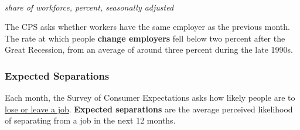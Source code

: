 \begin{minipage}{0.40\textwidth}
\\
\footnotesize{\textit{share of workforce, percent, seasonally adjusted}}
\vspace{2.6cm}

\hspace{5mm} 

\end{minipage}\hspace{5mm}
\begin{minipage}{0.32\textwidth}
\small The CPS asks whether workers have the same employer as the previous month. The rate at which people \textbf{change employers} fell below two percent after the Great Recession, from an average of around three percent during the late 1990s. 

 
\end{minipage}
\vspace{1.5mm}

\subsubsection*{Expected Separations}
\vspace{-1mm}
\begin{minipage}{0.76\textwidth}
\small Each month, the Survey of Consumer Expectations asks how likely people are to \href{https://www.newyorkfed.org/microeconomics/sce#/jobsep-1}{lose or leave a job}. \textbf{Expected separations} are the average perceived likelihood of separating from a job in the next 12 months. 
\end{minipage}

